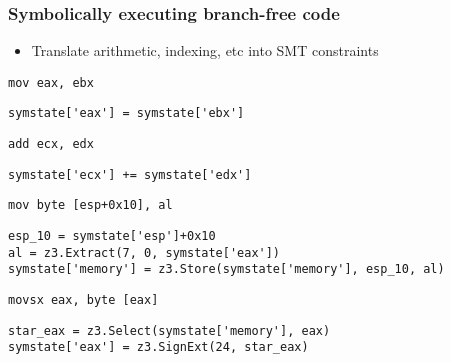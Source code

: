 \documentclass[aspectratio=169]{beamer}
\begin{document}
\begin{frame}[fragile]
\frametitle{Symbolically executing branch-free code}
\begin{itemize}
\item Translate arithmetic, indexing, etc into SMT constraints
\end{itemize}
\begin{minipage}{0.3\textwidth}
\begin{Verbatim}[fontsize=\scriptsize, frame=single]
mov eax, ebx
\end{Verbatim}
\end{minipage}
\begin{minipage}{0.68\textwidth}
\begin{Verbatim}[fontsize=\scriptsize, frame=single]
symstate['eax'] = symstate['ebx']
\end{Verbatim}
\end{minipage}

\begin{minipage}{0.3\textwidth}
\begin{Verbatim}[fontsize=\scriptsize, frame=single]
add ecx, edx
\end{Verbatim}
\end{minipage}
\begin{minipage}{0.68\textwidth}
\begin{Verbatim}[fontsize=\scriptsize, frame=single]
symstate['ecx'] += symstate['edx']
\end{Verbatim}
\end{minipage}

\begin{minipage}{0.3\textwidth}
\begin{Verbatim}[fontsize=\scriptsize, frame=single]
mov byte [esp+0x10], al
\end{Verbatim}
\end{minipage}
\begin{minipage}{0.68\textwidth}
\begin{Verbatim}[fontsize=\scriptsize, frame=single]
esp_10 = symstate['esp']+0x10
al = z3.Extract(7, 0, symstate['eax'])
symstate['memory'] = z3.Store(symstate['memory'], esp_10, al)
\end{Verbatim}
\end{minipage}

\begin{minipage}{0.3\textwidth}
\begin{Verbatim}[fontsize=\scriptsize, frame=single]
movsx eax, byte [eax]
\end{Verbatim}
\end{minipage}
\begin{minipage}{0.68\textwidth}
\begin{Verbatim}[fontsize=\scriptsize, frame=single]
star_eax = z3.Select(symstate['memory'], eax)
symstate['eax'] = z3.SignExt(24, star_eax)
\end{Verbatim}
\end{minipage}
\end{frame}
\end{document}
